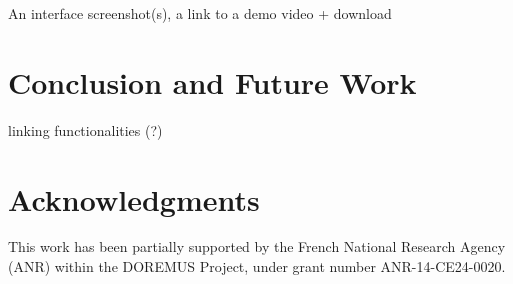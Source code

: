 \documentclass[runningheads,a4paper]{llncs}
\begin{document}
An interface screenshot(s), a link to a demo video + download


\section{Conclusion and Future Work}

linking functionalities (?)

\section*{Acknowledgments}
This work has been partially supported by the French National Research Agency (ANR) within the DOREMUS Project, under grant number ANR-14-CE24-0020.



\end{document}
